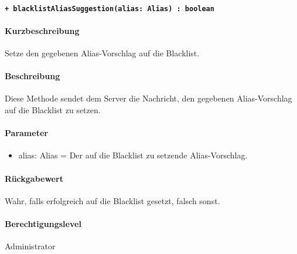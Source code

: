 \paragraph{\texttt{+ blacklistAliasSuggestion(alias: Alias) : boolean}}%
\paragraph*{Kurzbeschreibung}
Setze den gegebenen Alias-Vorschlag auf die Blacklist.
\paragraph*{Beschreibung}
Diese Methode sendet dem Server die Nachricht, den gegebenen Alias-Vorschlag auf die Blacklist zu setzen.
\paragraph*{Parameter}
\begin{itemize}
    \item alias: Alias = Der auf die Blacklist zu setzende Alias-Vorschlag.
\end{itemize}
\paragraph*{Rückgabewert}
Wahr, falls erfolgreich auf die Blacklist gesetzt, falsch sonst.
\paragraph*{Berechtigungslevel}
Administrator